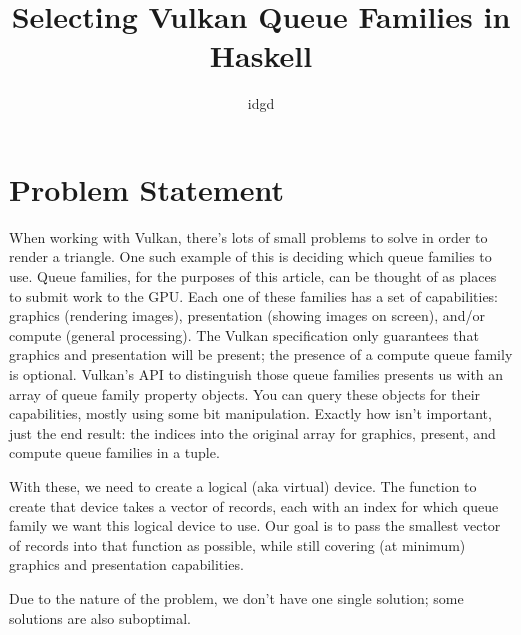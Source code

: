 \documentclass{article}
\title{Selecting Vulkan Queue Families in Haskell}
\author{idgd}
\date{}
\begin{document}
\maketitle

\section{Problem Statement}

When working with Vulkan, there's lots of small problems to solve in order to render a triangle.
One such example of this is deciding which queue families to use.
Queue families, for the purposes of this article, can be thought of as places to submit work to the GPU.
Each one of these families has a set of capabilities: graphics (rendering images), presentation (showing images on screen), and/or compute (general processing).
The Vulkan specification only guarantees that graphics and presentation will be present; the presence of a compute queue family is optional. Vulkan's API to distinguish those queue families presents us with an array of queue family property objects.
You can query these objects for their capabilities, mostly using some bit manipulation.
Exactly how isn't important, just the end result: the indices into the original array for graphics, present, and compute queue families in a tuple.

With these, we need to create a logical (aka virtual) device.
The function to create that device takes a vector of records, each with an index for which queue family we want this logical device to use.
Our goal is to pass the smallest vector of records into that function as possible, while still covering (at minimum) graphics and presentation capabilities.

Due to the nature of the problem, we don't have one single solution; some solutions are also suboptimal.
\end{document}
